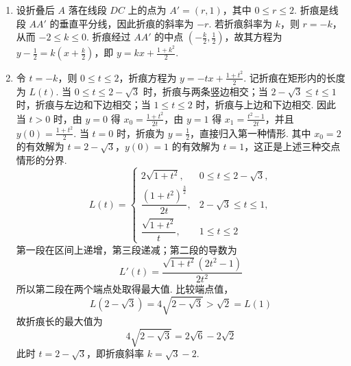 \begin{solution}
\begin{enumerate}
\item
设折叠后 \(A\) 落在线段 \(DC\) 上的点为 \(A'=(r,1)\)，其中 \(0\leqslant r\leqslant2\). 折痕是线段 \(AA'\) 的垂直平分线，因此折痕的斜率为 \(-r\). 若折痕斜率为 \(k\)，则 \(r=-k\)，从而
\(-2\leqslant k\leqslant0\).
折痕经过 \(AA'\) 的中点 \(\left(-\frac{k}{2},\frac12\right)\)，故其方程为
\(y-\frac12=k\left(x+\frac{k}{2}\right)\)，即 \(y=kx+\frac{1+k^2}{2}\).

\item
令 \(t=-k\)，则 \(0\leqslant t\leqslant2\)，折痕方程为
\(y=-tx+\frac{1+t^2}{2}\).
记折痕在矩形内的长度为 \(L(t)\). 当 \(0\leqslant t\leqslant2-\sqrt3\) 时，折痕与两条竖边相交；当 \(2-\sqrt3\leqslant t\leqslant1\) 时，折痕与左边和下边相交；当 \(1\leqslant t\leqslant2\) 时，折痕与上边和下边相交. 因此
当 \(t>0\) 时，由 \(y=0\) 得 \(x_0=\frac{1+t^2}{2t}\)，由 \(y=1\) 得 \(x_1=\frac{t^2-1}{2t}\)，并且 \(y(0)=\frac{1+t^2}{2}\). 当 \(t=0\) 时，折痕为 \(y=\frac12\)，直接归入第一种情形.
其中 \(x_0=2\) 的有效解为 \(t=2-\sqrt3\)，\(y(0)=1\) 的有效解为 \(t=1\)，这正是上述三种交点情形的分界.
\[
L(t)=
\begin{cases}
2\sqrt{1+t^2},&0\leqslant t\leqslant2-\sqrt3,\\
\dfrac{(1+t^2)^{\frac{3}{2}}}{2t},&2-\sqrt3\leqslant t\leqslant1,\\
\dfrac{\sqrt{1+t^2}}{t},&1\leqslant t\leqslant2
\end{cases}
\]
第一段在区间上递增，第三段递减；第二段的导数为
\[
L'(t)=\frac{\sqrt{1+t^2}(2t^2-1)}{2t^2}
\]
所以第二段在两个端点处取得最大值. 比较端点值，
\[
L(2-\sqrt3)=4\sqrt{2-\sqrt3}>\sqrt2=L(1)
\]
故折痕长的最大值为
\[
4\sqrt{2-\sqrt3}=2\sqrt6-2\sqrt2
\]
此时 \(t=2-\sqrt3\)，即折痕斜率 \(k=\sqrt3-2\).
\end{enumerate}
\end{solution}
